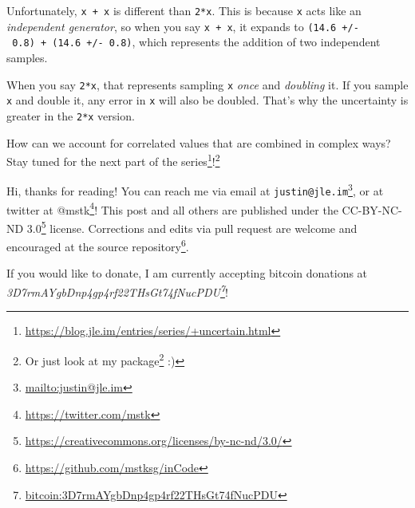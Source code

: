\documentclass[]{article}
\renewcommand{\href}[2]{#2\footnote{\url{#1}}}
\begin{document}
Unfortunately, \texttt{x\ +\ x} is different than \texttt{2*x}. This is because
\texttt{x} acts like an \emph{independent generator}, so when you say
\texttt{x\ +\ x}, it expands to \texttt{(14.6\ +/-\ 0.8)\ +\ (14.6\ +/-\ 0.8)},
which represents the addition of two independent samples.

When you say \texttt{2*x}, that represents sampling \texttt{x} \emph{once} and
\emph{doubling} it. If you sample \texttt{x} and double it, any error in
\texttt{x} will also be doubled. That's why the uncertainty is greater in the
\texttt{2*x} version.

How can we account for correlated values that are combined in complex ways? Stay
tuned for the next part of the
\href{https://blog.jle.im/entries/series/+uncertain.html}{series}!\footnote{Or
  just look at my \href{https://hackage.haskell.org/package/uncertain}{package}
  :)}

Hi, thanks for reading! You can reach me via email at
\href{mailto:justin@jle.im}{\nolinkurl{justin@jle.im}}, or at twitter at
\href{https://twitter.com/mstk}{@mstk}! This post and all others are published
under the \href{https://creativecommons.org/licenses/by-nc-nd/3.0/}{CC-BY-NC-ND
3.0} license. Corrections and edits via pull request are welcome and encouraged
at \href{https://github.com/mstksg/inCode}{the source repository}.

If you would like to donate, I am currently accepting bitcoin donations at
\emph{\href{bitcoin:3D7rmAYgbDnp4gp4rf22THsGt74fNucPDU}{3D7rmAYgbDnp4gp4rf22THsGt74fNucPDU}}!
\end{document}
